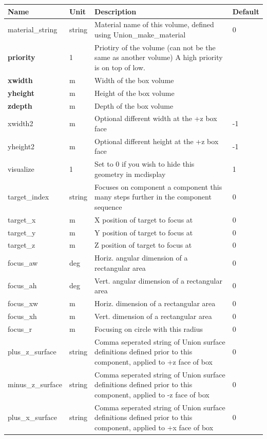\begin{longtable}{p{}p{}p{}p{}}
\toprule
\textbf{Name} & \textbf{Unit} & \textbf{Description} & \textbf{Default} \\
\midrule
\endhead
material\_string & string & Material name of this volume, defined using Union\_make\_material & 0 \\
\textbf{priority} & 1 & Priotiry of the volume (can not be the same as another volume) A high priority is on top of low. &  \\
\textbf{xwidth} & m & Width of the box volume &  \\
\textbf{yheight} & m & Height of the box volume &  \\
\textbf{zdepth} & m & Depth of the box volume &  \\
xwidth2 & m & Optional different width at the +z box face & -1 \\
yheight2 & m & Optional different height at the +z box face & -1 \\
visualize & 1 & Set to 0 if you wish to hide this geometry in mcdisplay & 1 \\
target\_index & string & Focuses on component a component this many steps further in the component sequence & 0 \\
target\_x & m & X position of target to focus at & 0 \\
target\_y & m & Y position of target to focus at & 0 \\
target\_z & m & Z position of target to focus at & 0 \\
focus\_aw & deg & Horiz. angular dimension of a rectangular area & 0 \\
focus\_ah & deg & Vert. angular dimension of a rectangular area & 0 \\
focus\_xw & m & Horiz. dimension of a rectangular area & 0 \\
focus\_xh & m & Vert. dimension of a rectangular area & 0 \\
focus\_r & m & Focusing on circle with this radius & 0 \\
plus\_z\_surface & string & Comma seperated string of Union surface definitions defined prior to this component, applied to +z face of box & 0 \\
minus\_z\_surface & string & Comma seperated string of Union surface definitions defined prior to this component, applied to -z face of box & 0 \\
plus\_x\_surface & string & Comma seperated string of Union surface definitions defined prior to this component, applied to +x face of box & 0 \\

\end{longtable}
